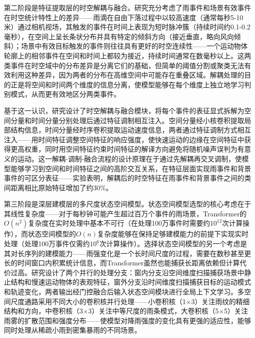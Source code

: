 第二阶段是特征提取层的时空解耦与融合。研究充分考虑了雨事件和场景有效事件在时空统计特性上的差异——雨滴在自由下落过程中以较高速度（通常每秒5-10米）通过相机视场，其触发的事件在时间上表现为短时脉冲簇（持续时间约0.1-0.2毫秒），在空间上呈长条状分布并具有特定的倾斜方向（接近垂直，略向风向倾斜）；场景中有效目标触发的事件则往往具有更好的时空连续性——一个运动物体轮廓上的相邻事件在空间和时间上都较为接近，持续时间通常在数毫秒以上。这两类事件在时空域中的分布差异是分离它们的基础，但简单的阈值分割或聚类无法有效利用这种差异，因为两者的分布在高维空间中可能存在重叠区域。解耦处理的目的正是将空间和时间两个维度的信息分离，使模型能够在每个维度上独立地学习判别模式，从而更有效地区分两类事件。

基于这一认识，研究设计了时空解耦与融合模块，将每个事件的表征显式拆解为空间分量和时间分量分别处理后通过特征调制相互注入。空间分量经小核卷积提取局部结构信息，时间分量经时序卷积提取运动速度信息，两者通过特征调制方式相互注入——用时间特征调整空间特征的响应强度，使快速运动的边缘在空间特征中获得更高权重，同时用空间特征约束时间特征的解译方向避免将随机噪声误判为有意义的运动。这一解耦-调制-融合流程的设计原理在于通过先解耦再交叉调制，使模型能够学习到空间和时间特征之间的高阶交互关系，在特征层面实现雨事件和背景事件的可区分表征——实验表明，解耦后的时空特征在雨事件和背景事件之间的类间距离相比原始特征增加了约30\%。

第三阶段是深层建模层的多尺度状态空间模型。状态空间模型选型的核心考虑在于其线性复杂度——对于每秒钟可能产生超过百万个事件的雨场景，Transformer的$O(n^2)$复杂度在实时处理中基本不可行（在处理100万事件时需要约$10^{12}$次计算操作），而状态空间模型的$O(n)$复杂度能够在保持足够建模能力的前提下实现实时处理（处理100万事件仅需约$10^6$次计算操作）。选择状态空间模型的另一个考虑是其对长序列的建模能力——雨强变化是一个长时间尺度的过程，需要在数秒甚至更长的时间窗口内积累统计信息，而Transformer虽然也能捕获长距离依赖但计算代价过高。研究设计了两个并行的处理分支：窗内分支沿空间维度扫描捕获场景中静止结构和慢速运动物体的表观特征，窗外分支沿时间维度扫描捕获目标的运动模式和轨迹变化，两者输出经门控融合后输入状态空间模块进行全局上下文学习。多空间尺度通路采用不同大小的卷积核并行处理——小卷积核（1$\times$3）关注雨纹的精细结构和方向，中卷积核（3$\times$3）关注中等尺度的雨条模式，大卷积核（5$\times$5）关注雨雾的扩散范围和强度分布——使模型对降雨强度的变化具有更强的适应性，能够同时处理从稀疏小雨到密集暴雨的不同场景。

